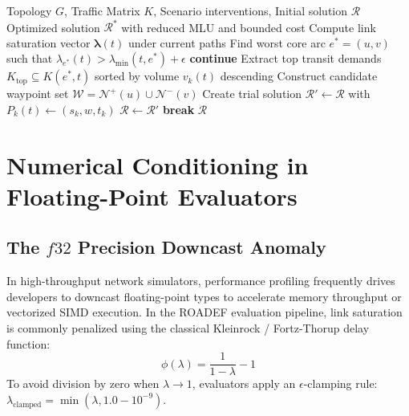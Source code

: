 \documentclass[10pt,journal,compsoc]{IEEEtran}
\begin{document}
\begin{algorithm}[t]
\caption{Surgical 1-Hop Transit Detour Optimization}
\label{alg:surgical}
\begin{algorithmic}[1]
\REQUIRE Topology $G$, Traffic Matrix $K$, Scenario interventions, Initial solution $\mathcal{R}$
\ENSURE Optimized solution $\mathcal{R}^*$ with reduced MLU and bounded cost
    \STATE Compute link saturation vector $\boldsymbol{\lambda}(t)$ under current paths
    \STATE Find worst core arc $e^* = (u, v)$ such that $\lambda_{e^*}(t) > \lambda_{\min}(t, e^*) + \epsilon$
        \STATE \textbf{continue} 
    \ENDIF
    \STATE Extract top transit demands $K_{\text{top}} \subseteq K(e^*, t)$ sorted by volume $v_k(t)$ descending
    \STATE Construct candidate waypoint set $\mathcal{W} = \mathcal{N}^+(u) \cup \mathcal{N}^-(v)$
            \STATE Create trial solution $\mathcal{R}' \leftarrow \mathcal{R}$ with $P_k(t) \leftarrow (s_k, w, t_k)$
                \STATE $\mathcal{R} \leftarrow \mathcal{R}'$
                \STATE \textbf{break} 
            \ENDIF
        \ENDFOR
    \ENDFOR
\ENDFOR
\RETURN $\mathcal{R}$
\end{algorithmic}
\end{algorithm}

\section{Numerical Conditioning in Floating-Point Evaluators}

\subsection{The $f32$ Precision Downcast Anomaly}
In high-throughput network simulators, performance profiling frequently drives developers to downcast floating-point types to accelerate memory throughput or vectorized SIMD execution. In the ROADEF evaluation pipeline, link saturation is commonly penalized using the classical Kleinrock / Fortz-Thorup delay function:
\begin{equation}
\label{eq:kleinrock}
\phi(\lambda) = \frac{1}{1 - \lambda} - 1
\end{equation}
To avoid division by zero when $\lambda \to 1$, evaluators apply an $\epsilon$-clamping rule: $\lambda_{\text{clamped}} = \min(\lambda, 1.0 - 10^{-9})$.
\end{document}
